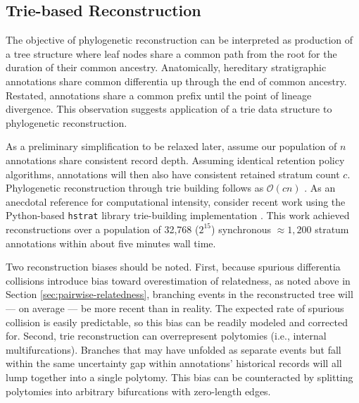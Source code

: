 \subsection{Trie-based Reconstruction}
\label{sec:trie-based-reconstruction}

The objective of phylogenetic reconstruction can be interpreted as production of a tree structure where leaf nodes share a common path from the root for the duration of their common ancestry.
Anatomically, hereditary stratigraphic annotations share common differentia up through the end of common ancestry.
Restated, annotations share a common prefix until the point of lineage divergence.
This observation suggests application of a trie data structure \citep{fredkin1960trie} to phylogenetic reconstruction.

As a preliminary simplification to be relaxed later, assume our population of $n$ annotations share consistent record depth.
Assuming identical retention policy algorithms, annotations will then also have consistent retained stratum count $c$.
Phylogenetic reconstruction through trie building follows as $\mathcal{O}(c n)$ \citep{mehta2018handbook}.
As an anecdotal reference for computational intensity, consider recent work using the Python-based \texttt{hstrat} library trie-building implementation \citep{moreno2023toward}.
This work achieved reconstructions over a population of 32,768 ($2^15$) synchronous $\approx 1,200$ stratum annotations within about five minutes wall time.

Two reconstruction biases should be noted.
First, because spurious differentia collisions introduce bias toward overestimation of relatedness, as noted above in Section \ref{sec:pairwise-relatedness}, branching events in the reconstructed tree will --- on average --- be more recent than in reality.
The expected rate of spurious collision is easily predictable, so this bias can be readily modeled and corrected for.
Second, trie reconstruction can overrepresent polytomies (i.e., internal multifurcations).
Branches that may have unfolded as separate events but fall within the same uncertainty gap within annotations' historical records will all lump together into a single polytomy.
This bias can be counteracted by splitting polytomies into arbitrary bifurcations with zero-length edges.

